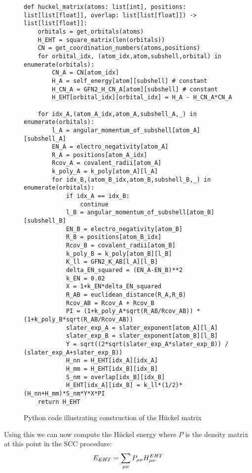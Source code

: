 \begin{figure}[H]
\begin{verbatim}
def huckel_matrix(atoms: list[int], positions: list[list[float]], overlap: list[list[float]]) -> list[list[float]]:
    orbitals = get_orbitals(atoms)
    H_EHT = square_matrix(len(orbitals))
    CN = get_coordination_numbers(atoms,positions)
    for orbital_idx, (atom_idx,atom,subshell,orbital) in enumerate(orbitals):
        CN_A = CN[atom_idx]
        H_A = self_energy[atom][subshell] # constant
        H_CN_A = GFN2_H_CN_A[atom][subshell] # constant
        H_EHT[orbital_idx][orbital_idx] = H_A - H_CN_A*CN_A

    for idx_A,(atom_A_idx,atom_A,subshell_A,_) in enumerate(orbitals):
        l_A = angular_momentum_of_subshell[atom_A][subshell_A]
        EN_A = electro_negativity[atom_A]
        R_A = positions[atom_A_idx]
        Rcov_A = covalent_radii[atom_A]
        k_poly_A = k_poly[atom_A][l_A]
        for idx_B,(atom_B_idx,atom_B,subshell_B,_) in enumerate(orbitals):
            if idx_A == idx_B:
                continue
            l_B = angular_momentum_of_subshell[atom_B][subshell_B]
            EN_B = electro_negativity[atom_B]
            R_B = positions[atom_B_idx]
            Rcov_B = covalent_radii[atom_B]
            k_poly_B = k_poly[atom_B][l_B]
            K_ll = GFN2_K_AB[l_A][l_B]
            delta_EN_squared = (EN_A-EN_B)**2
            k_EN = 0.02
            X = 1+k_EN*delta_EN_squared
            R_AB = euclidean_distance(R_A,R_B) 
            Rcov_AB = Rcov_A + Rcov_B 
            PI = (1+k_poly_A*sqrt(R_AB/Rcov_AB)) * (1+k_poly_B*sqrt(R_AB/Rcov_AB))
            slater_exp_A = slater_exponent[atom_A][l_A]
            slater_exp_B = slater_exponent[atom_B][l_B]
            Y = sqrt((2*sqrt(slater_exp_A*slater_exp_B)) / (slater_exp_A+slater_exp_B))
            H_nn = H_EHT[idx_A][idx_A]
            H_mm = H_EHT[idx_B][idx_B]
            S_nm = overlap[idx_B][idx_B]
            H_EHT[idx_A][idx_B] = k_ll*(1/2)*(H_nn+H_mm)*S_nm*Y*X*PI
    return H_EHT
\end{verbatim}
\caption{Python code illustrating construction of the Hückel matrix}
\end{figure}
Using this we can now compute the Hückel energy where $P$ is the density matrix at this point in the SCC procedure:
\begin{equation}
    \E{EHT} = \sum_{\mu\nu}P_{\mu\nu}H^{EHT}_{\mu\nu}\\
\end{equation}



